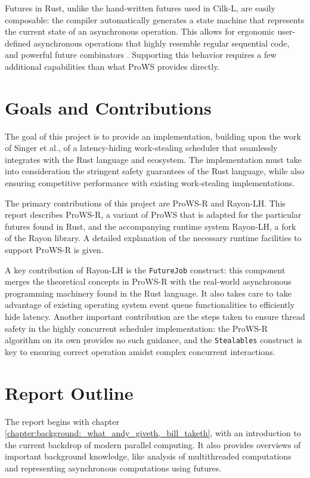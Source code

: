 \documentclass[bsc,frontabs,singlespacing,parskip,deptreport,normalheadings]{infthesis}
\begin{document}
Futures in Rust, unlike the hand-written futures used in Cilk-L, are easily
composable: the compiler automatically generates a state machine that represents
the current state of an asynchronous operation. This allows for ergonomic
user-defined asynchronous operations that highly resemble regular sequential
code, and powerful future combinators \cite{noauthor_futuresfuture_nodate}.
Supporting this behavior requires a few additional capabilities than what ProWS
provides directly.

\section{Goals and Contributions}

The goal of this project is to provide an implementation, building upon the work
of Singer et al., of a latency-hiding work-stealing scheduler that seamlessly
integrates with the Rust language and ecosystem. The implementation must take
into consideration the stringent safety guarantees of the Rust language, while
also ensuring competitive performance with existing work-stealing
implementations.

The primary contributions of this project are ProWS-R and Rayon-LH. This report
describes ProWS-R, a variant of ProWS that is adapted for the particular futures
found in Rust, and the accompanying runtime system Rayon-LH, a fork of the Rayon
library. A detailed explanation of the necessary runtime facilities to support
ProWS-R is given.

A key contribution of Rayon-LH is the \texttt{FutureJob} construct: this
component merges the theoretical concepts in ProWS-R with the real-world
asynchronous programming machinery found in the Rust language. It also
takes care to take advantage of existing operating system event queue
functionalities to efficiently hide latency. Another important contribution are
the steps taken to ensure thread safety in the highly concurrent scheduler
implementation: the ProWS-R algorithm on its own provides no such guidance, and
the \texttt{Stealables} construct is key to ensuring correct operation amidst
complex concurrent interactions.

\section{Report Outline}

The report begins with chapter
\ref{chapter:background:_what_andy_giveth,_bill_taketh}, with an introduction to
the current backdrop of modern parallel computing. It also provides overviews of
important background knowledge, like analysis of multithreaded computations and
representing asynchronous computations using futures.
\end{document}
